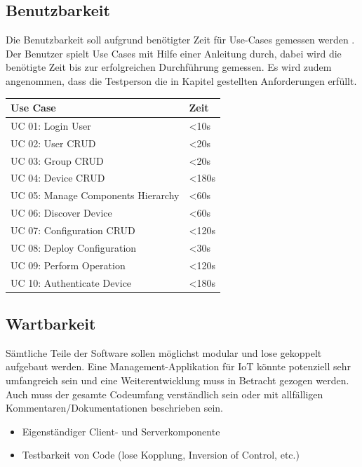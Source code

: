 \subsection{Benutzbarkeit}
Die Benutzbarkeit soll aufgrund benötigter Zeit für Use-Cases gemessen werden \cite{ReinhardSteiner}. Der Benutzer spielt Use Cases mit Hilfe einer Anleitung durch, dabei wird die benötigte Zeit bis zur erfolgreichen Durchführung gemessen. Es wird zudem angenommen, dass die Testperson die in Kapitel gestellten Anforderungen erfüllt.

\begin{center}
\begin{longtable}{| p{8cm} | p{2.5cm} |}
\hline
\textbf{Use Case} 						& \textbf{Zeit}\\ \hline
UC 01: Login User    					& <10s \\ \hline
UC 02: User CRUD			 			& <20s \\ \hline
UC 03: Group CRUD	         			& <20s \\ \hline 
UC 04: Device CRUD               		& <180s \\ \hline 
UC 05: Manage Components Hierarchy		& <60s \\ \hline 
UC 06: Discover Device     				& <60s \\ \hline
UC 07: Configuration CRUD			 	& <120s \\ \hline
UC 08: Deploy Configuration				& <30s \\ \hline
UC 09: Perform Operation			 	& <120s \\ \hline
UC 10: Authenticate Device	 			& <180s \\ \hline
\end{longtable}
\end{center}
\subsection{Wartbarkeit}
Sämtliche Teile der Software sollen möglichst modular und lose gekoppelt aufgebaut werden. Eine Management-Applikation für IoT könnte potenziell sehr umfangreich sein und eine Weiterentwicklung muss in Betracht gezogen werden. Auch muss der gesamte Codeumfang verständlich sein oder mit allfälligen Kommentaren/Dokumentationen beschrieben sein.
\begin{itemize}
\item Eigenständiger Client- und Serverkomponente
\item Testbarkeit von Code (lose Kopplung, Inversion of Control, etc.)
\end{itemize}

